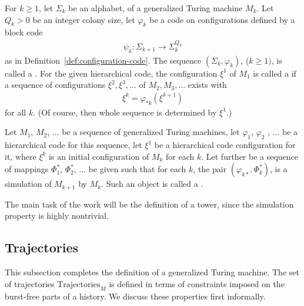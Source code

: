 \documentclass[11pt]{memoir}
\theoremstyle{definition} %
\renewcommand{\ge}{\geq}
\newcommand{\Q}{Q}
\newcommand{\Trajectories}{\mathrm{Trajectories}}
\begin{document}
\begin{definition}\label{def:hierarchical-code}
For \( k\ge 1 \), let \( \Sigma_{k} \) be an alphabet, of a generalized Turing machine \( M_{k} \).
Let \( \Q_{k}>0 \) be an integer colony size, let \( \varphi_{k} \)
be a code on configurations defined by a block code
  \begin{align*}
       \psi_{k}: \Sigma_{k+1}\to \Sigma_{k}^{\Q_{k}}
  \end{align*}
as in Definition~\ref{def:configuration-code}.
The sequence \( (\Sigma_{k},\varphi_{k}) \), (\( k\ge 1) \),  is
called a .
For the given hierarchical code, the configuration \( \xi^{1} \) of \( M_{1} \)
is called a  if a sequence
of configurations \( \xi^{2},\xi^{3},\dots \) of \( M_{2},M_{3},\dots \) exists with
\begin{align*}
 \xi^{k}=\varphi_{*k}(\xi^{k+1})
 \end{align*} 
for all \( k \).
(Of course, then whole sequence is determined by \( \xi^{1} \).)

Let \( M_{1} \), \( M_{2} \), \( \dots\) be a sequence of generalized Turing machines,
let \( \varphi_{1} \), \( \varphi_{2} \) , \(\dots \) be a hierarchical code for this sequence,
let \( \xi^{1} \) be a hierarchical code configuration for it, where \( \xi^{k} \) is an
initial configuration of \( M_{k} \) for each \( k \).
Let further be a sequence of mappings \( \Phi^{*}_{1} \), \( \Phi^{*}_{2} \), \( \dots \) be
given such that for each \( k \), the pair \( (\varphi_{k*},\Phi_{k}^{*}) \),
is a simulation of \( M_{k+1} \) by \( M_{k} \).
Such an object is called a .
\end{definition}

The main task of the work will be the definition of a tower, since the simulation
property is highly nontrivial.

\subsection{Trajectories}\label{sec:traj}

This subsection completes the definition of a generalized Turing machine.
The set of trajectories \( \Trajectories_{M} \) 
is defined in terms of constraints imposed on the burst-free parts of a history.
We discuss these properties first informally.
\end{document}

